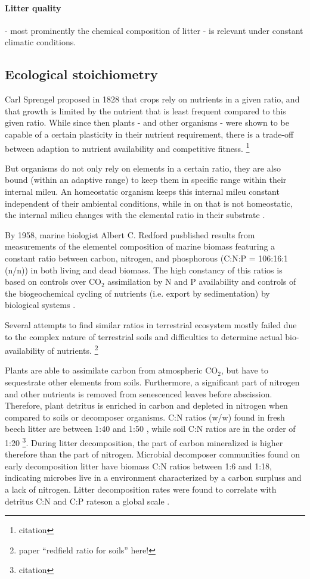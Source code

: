 \paragraph{Litter quality} - most prominently the chemical composition of litter - is relevant under constant climatic conditions. 

\subsection{Ecological stoichiometry}

Carl Sprengel proposed in 1828 that crops rely on nutrients in a given ratio, and that growth is limited by the nutrient that is least frequent compared to this given ratio. While since then plants - and other organisms - were shown to be capable of a certain plasticity in their nutrient requirement, there is a trade-off between adaption to nutrient availability and competitive fitness. \footnote{citation}

But organisms do not only rely on elements in a certain ratio, they are also bound (within an adaptive range) to keep them in specific range within their internal mileu. An homeostatic organism keeps this internal mileu constant independent of their ambiental conditions, while in on that is not homeostatic, the internal milieu changes with the elemental ratio in their substrate \citep{Sterner2002}. 

By 1958, marine biologist Albert C. Redford pusblished results from measurements of the elementel composition of marine biomass featuring a constant ratio between carbon, nitrogen, and phosphorous (C:N:P = 106:16:1 (n/n)) in both living and dead biomass. The high constancy of this ratios is based on controls over CO$_2$ assimilation by N and P availability and controls of the  biogeochemical cycling of nutrients (i.e. export by sedimentation) by biological systems \citep{Cleveland2007}. 

Several attempts to find similar ratios in terrestrial ecosystem mostly failed due to the complex nature of terrestrial soils and difficulties to determine actual bio-availability of nutrients. \footnote{paper “redfield ratio for soils” here!}

Plants are able to assimilate carbon from atmospheric CO$_2$, but have to sequestrate other elements from soils. Furthermore, a significant part of nitrogen and other nutrients is removed from senescenced leaves before abscission. Therefore, plant detritus is enriched in carbon and depleted in nitrogen when compared to soils or decomposer organisms. C:N ratios (w/w) found in fresh beech litter are between 1:40 and 1:50 \citep{Mooshammer2011}, while soil C:N ratios are in the order of 1:20 \footnote{citation}. During litter decomposition, the part of carbon mineralized is higher therefore than the part of nitrogen. Microbial decomposer communities found on early decomposition litter have biomass C:N ratios between 1:6 and 1:18, indicating microbes live in a environment characterized by a carbon surpluss and a lack of nitrogen. Litter decomposition rates were found to correlate with detritus C:N and C:P rateson a global scale \citep{Enriquez1993}.

